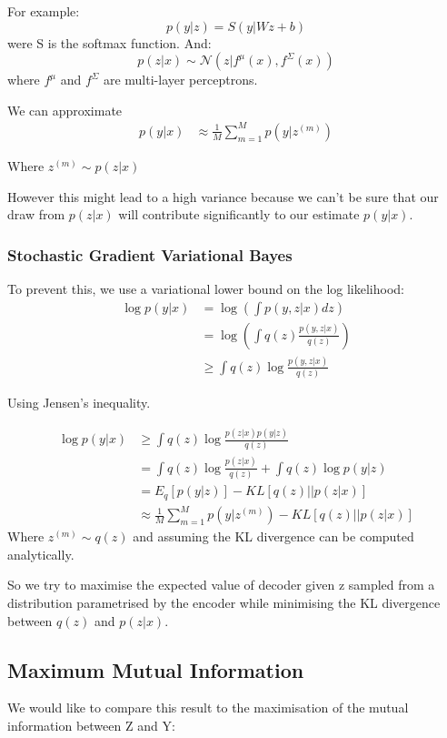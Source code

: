 \documentclass[10pt,oneside,openright]{report}
\begin{document}
For example:
$$ p(y|z) = S(y | Wz + b) $$ were S is the softmax function.
And:
$$ p(z|x) \sim \mathcal{N}(z | f^\mu(x), f^\Sigma(x))$$ where $f^\mu$ and $f^\Sigma$ are multi-layer perceptrons.

We can approximate
\begin{align}
 p(y|x) &\approx \frac{1}{M} \sum^M_{m=1} p(y | z^{(m)}) 
\end{align}

Where $ z^{(m)} \sim p(z|x) $

However this might lead to a high variance because we can't be sure that our draw from $p(z | x)$ will contribute significantly to our estimate $p(y |x)$.

\subsubsection{Stochastic Gradient Variational Bayes}

To prevent this, we use a variational lower bound on the log likelihood:
\begin{align}
 \log p(y|x) &= \log(\int p(y, z|x) dz) \\
 & =  \log(\int q(z) \frac{p(y, z|x)}{q(z)}) \\
 & \geq \int q(z) \log \frac{p(y, z|x)}{q(z)}
\end{align}

Using Jensen's inequality.

\begin{align}
 \log p(y|x) & \geq \int q(z) \log \frac{p(z|x) p(y| z)}{q(z)} \\
  &= \int q(z) \log \frac{p(z|x)}{q(z)}  + \int q(z) \log p(y|z) \\
  &= E_q[p(y|z)] - KL[q(z) || p(z|x)]\\
  &\approx  \frac{1}{M} \sum^M_{m=1} p(y | z^{(m)}) - KL[q(z) || p(z|x)]
\end{align}
Where $ z^{(m)} \sim q(z)$ and assuming the KL divergence can be computed analytically.

So we try to maximise the expected value of decoder given z sampled from a distribution parametrised by the encoder while minimising the KL divergence between $q(z)$ and $p(z|x)$.

\subsection{Maximum Mutual Information}

We would like to compare this result to the maximisation of the  mutual information between Z and Y:
\end{document}
